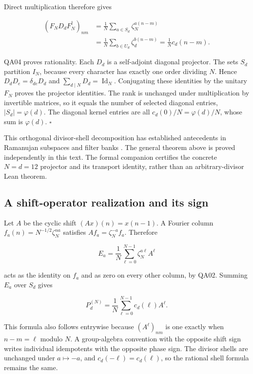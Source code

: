 Direct multiplication therefore gives

\[
\begin{aligned}
(F_ND_dF_N^\dagger)_{nm}
&=\frac1N\sum_{a\in S_d}\zeta_N^{a(n-m)}\\
&=\frac1N\sum_{b\in U_d}\zeta_d^{b(n-m)}
=\frac1N c_d(n-m).
\end{aligned}
\]

QA04 proves rationality. Each \(D_d\) is a self-adjoint diagonal
projector. The sets \(S_d\) partition \(I_N\), because every character
has exactly one order dividing \(N\). Hence \(D_dD_e=\delta_{de}D_d\)
and \(\sum_{d\mid N}D_d=\operatorname{Id}_N\). Conjugating these identities by the
unitary \(F_N\) proves the projector identities. The rank is unchanged
under multiplication by invertible matrices, so it equals the number of
selected diagonal entries, \(|S_d|=\varphi(d)\). The diagonal kernel
entries are all \(c_d(0)/N=\varphi(d)/N\), whose sum is \(\varphi(d)\).
\(\square\)

This orthogonal divisor-shell decomposition has established antecedents
in Ramanujan subspaces and filter banks \cite{Vaidyanathan2014FIR,Vaidyanathan2014I,Vaidyanathan2014II}. The general theorem above is
proved independently in this text. The formal companion certifies the
concrete \(N=d=12\) projector and its transport identity, rather than an
arbitrary-divisor Lean theorem.

\hypertarget{a-shift-operator-realization-and-its-sign}{%
\subsection{A shift-operator realization and its
sign}\label{a-shift-operator-realization-and-its-sign}}

Let \(A\) be the cyclic shift \((Ax)(n)=x(n-1)\). A Fourier column
\(f_a(n)=N^{-1/2}\zeta_N^{na}\) satisfies \(Af_a=\zeta_N^{-a}f_a\).
Therefore

\[
E_a=\frac1N\sum_{\ell=0}^{N-1}\zeta_N^{a\ell}A^\ell
\]

acts as the identity on \(f_a\) and as zero on every other column, by
QA02. Summing \(E_a\) over \(S_d\) gives

\[
P_d^{(N)}=\frac1N\sum_{\ell=0}^{N-1}c_d(\ell)A^\ell.
\]

This formula also follows entrywise because \((A^\ell)_{nm}\) is one
exactly when \(n-m=\ell\) modulo \(N\). A group-algebra convention with
the opposite shift sign writes individual idempotents with the opposite
phase sign. The divisor shells are unchanged under \(a\mapsto -a\), and
\(c_d(-\ell)=c_d(\ell)\), so the rational shell formula remains the
same.

